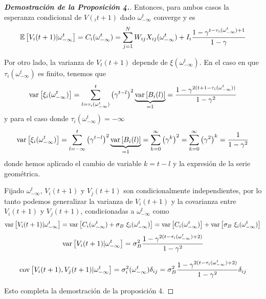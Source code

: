 \begin{proof}[\bf{Demostración de la Proposición 4.}]
Entonces, para ambos casos la esperanza condicional de $V(_it+1)$ dado $\omega_{-\infty}^t$ converge y es
\begin{equation}
    \mathbb{E} \left[V_i(t+1) | \omega_{-\infty}^t\right] = C_i(\omega_{-\infty}^t) =
    \sum_{j=1}^N W_{ij} X_{ij}(\omega_{-\infty}^t) + I_i \frac{1-\gamma^{t-\tau_i(\omega_{-\infty}^t)+1}}{1-\gamma}
\end{equation}

Por otro lado, la varianza de $V_t(t+1)$ depende de $\xi(\omega_{-\infty}^t)$. En el caso en que $\tau_i(\omega_{-\infty}^t)$ es finito, tenemos que
\begin{equation*}
    \text{var}\left[\xi_i(\omega_{-\infty}^t)\right] = \sum_{l=\tau_i(\omega_{-\infty}^t)}^t \left(\gamma^{t-l}\right)^2 \underbrace{\text{var}\left[B_i(l)\right]}_{=1} = \frac{1-\gamma^{2(t+1-\tau_i(\omega_{-\infty}^t))}}{1-\gamma^2}
\end{equation*}
y para el caso donde $\tau_i(\omega_{-\infty}^t) = -\infty$ 
\begin{equation*}
    \text{var}\left[\xi_i(\omega_{-\infty}^t)\right] = \sum_{l=-\infty}^t \left(\gamma^{t-l}\right)^2 \underbrace{\text{var}\left[B_i(l)\right]}_{=1} = \sum_{k=0}^\infty \left(\gamma^k\right)^2 = \sum_{k=0}^\infty \left(\gamma^2\right)^k =\frac{1}{1-\gamma^2}
\end{equation*}
donde hemos aplicado el cambio de variable $k=t-l$ y la expresión de la serie geométrica.

Fijado $\omega_{-\infty}^t$, $V_i(t+1)$ y $V_j(t+1)$ son condicionalmente independientes, por lo tanto podemos generalizar la varianza de $V_i(t+1)$ y la covarianza entre $V_i(t+1)$ y $V_j(t+1)$, condicionadas a $\omega_{-\infty}^t$ como
\begin{equation}
    \text{var}\left[V_i(t+1) | \omega_{-\infty}^t\right] = \text{var}\left[C_i(\omega_{-\infty}^t) + \sigma_B \  \xi_i(\omega_{-\infty}^t)\right] = \text{var}\left[C_i(\omega_{-\infty}^t)\right] + \text{var}\left[ \sigma_B \  \xi_i(\omega_{-\infty}^t)\right] 
\end{equation}
\begin{equation}
    \text{var}\left[V_i(t+1) | \omega_{-\infty}^t\right] = \sigma_B^2 \frac{1-\gamma^{2(t-\tau_i(\omega_{-\infty}^t)+2)}}{1-\gamma^2}
\end{equation}

\begin{equation}
    \text{cov}\left[V_i(t+1),V_j(t+1) | \omega_{-\infty}^t\right] = \sigma_i^2(\omega_{-\infty}^t) \delta_{ij} = \sigma_B^2 \frac{1-\gamma^{2(t-\tau_i(\omega_{-\infty}^t)+2)}}{1-\gamma^2} \delta_{ij}
\end{equation}

Esto completa la demostración de la proposición 4.

\end{proof}

